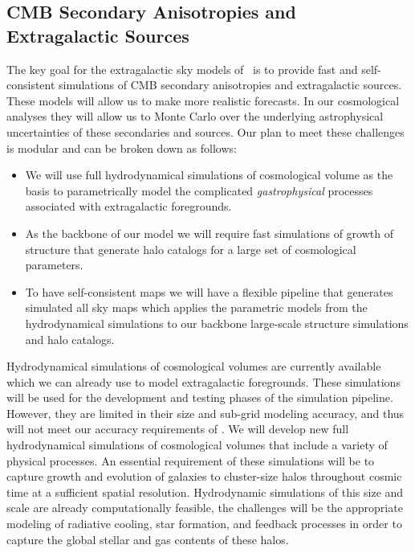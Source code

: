 \subsection{CMB Secondary Anisotropies and Extragalactic Sources}

The key goal for the extragalactic sky models of \cmbexp\ is to provide fast and self-consistent simulations of CMB secondary anisotropies and extragalactic sources. These models will allow us to make more realistic forecasts. In our cosmological analyses they will allow us to Monte Carlo over the underlying astrophysical uncertainties of these secondaries and sources. Our plan to meet these challenges is modular and can be broken down as follows: 

\begin{itemize}
\item We will use full hydrodynamical simulations of cosmological volume as the basis to parametrically model the complicated {\it gastrophysical} processes associated with extragalactic foregrounds.
\item As the backbone of our model we will require fast simulations of growth of structure that generate halo catalogs for a large set of cosmological parameters.
\item To have self-consistent maps we will have a flexible pipeline that generates simulated all sky maps which applies the parametric models from the hydrodynamical simulations to our backbone large-scale structure simulations and halo catalogs.
\end{itemize}

Hydrodynamical simulations of cosmological volumes are currently available which we can already use to model extragalactic foregrounds. These simulations will be used for the development and testing phases of the simulation pipeline. However, they are limited in their size and sub-grid modeling accuracy, and thus will not meet our accuracy requirements of \cmbexp. We will develop new full hydrodynamical simulations of cosmological volumes that include a variety of physical processes. An essential requirement of these simulations will be to capture growth and evolution of galaxies to cluster-size halos throughout cosmic time at a sufficient spatial resolution. Hydrodynamic simulations of this size and scale are already computationally feasible, the challenges will be the appropriate modeling of radiative cooling, star formation, and feedback processes in order to capture the global stellar and gas contents of these halos.


